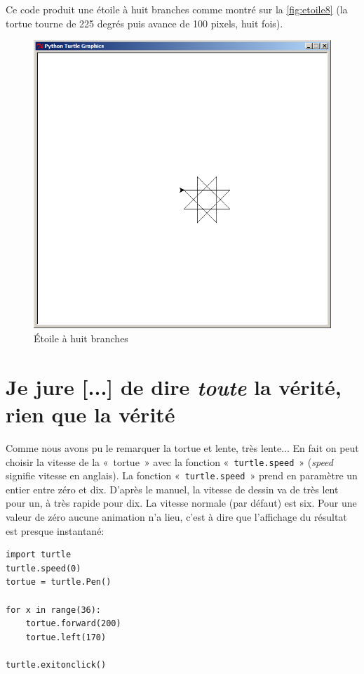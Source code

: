 Ce code produit une étoile à huit branches comme montré sur la \autoref{fig:etoile8} (la tortue tourne de 225 degrés puis avance de 100 pixels, huit fois).
\begin{figure}[h!]
\centering
\includegraphics[scale=0.4]{images/etoile8}
\caption{Étoile à huit branches}\label{fig:etoile8}
\end{figure}


\section{Je jure [...] de dire \emph{toute} la vérité, rien que la vérité}

Comme nous avons pu le remarquer la tortue et lente, très lente... En fait on peut choisir la vitesse de la «~tortue~» avec la fonction «~\texttt{turtle.speed}~» (\emph{speed} signifie vitesse en anglais). La fonction «~\texttt{turtle.speed}~» prend en paramètre un entier entre zéro et dix. D'après le manuel, la vitesse de dessin va de très lent pour un, à très rapide pour dix. La vitesse normale (par défaut) est six. Pour une valeur de zéro aucune animation n'a lieu, c'est à dire que l'affichage du résultat est presque instantané:

\begin{Verbatim}[frame=single,rulecolor=\color{mbleu}, label=à taper]
import turtle
turtle.speed(0)
tortue = turtle.Pen()

for x in range(36):
    tortue.forward(200)
    tortue.left(170)
    
turtle.exitonclick()
\end{Verbatim}

